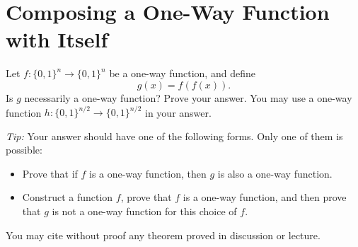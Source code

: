 \documentclass[11pt]{article}
\numberwithin{equation}{section}
\newcommand{\bin}{\{0,1\}}
\newcommand{\bit}{\bin}
\begin{document}
\pagebreak

\section{Composing a One-Way Function with Itself}

Let $f:\bin^n\to\bin^n$ be a one-way function, and define
\[
    g(x)=f(f(x)).
\]
Is $g$ necessarily a one-way function? Prove your answer. You may use a
one-way function $h:\bit^{n/2}\to\bit^{n/2}$ in your answer.

\noindent\emph{Tip:} Your answer should have one of the following forms.
Only one of them is possible:
\begin{itemize}
    \item Prove that if $f$ is a one-way function, then $g$ is also a
    one-way function.
    \item Construct a function $f$, prove that $f$ is a one-way
    function, and then prove that $g$ is not a one-way function for this
    choice of $f$.
\end{itemize}
You may cite without proof any theorem proved in discussion or lecture.
\end{document}
